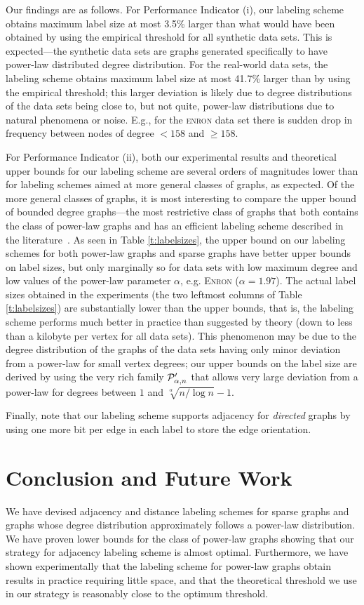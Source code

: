 Our findings are as follows. For Performance Indicator (i), our labeling scheme obtains maximum label size at most 3.5\% larger than what would have been obtained by using the empirical threshold for all synthetic data sets.
This is expected---the synthetic data sets are graphs generated specifically to have power-law distributed degree distribution. For the real-world data sets, the labeling scheme
obtains maximum label size at most 41.7\% larger than by using the empirical threshold; this larger deviation is likely due to degree distributions of the data sets being close to, but not quite,
power-law distributions due to natural phenomena or noise. E.g., for the \textsc{enron} data set there is sudden drop in frequency between nodes of degree $< 158$ and $\geq 158$.

For Performance Indicator (ii), both our experimental results and theoretical upper bounds for our labeling scheme are several orders of magnitudes lower than for labeling schemes aimed at more general classes of graphs, as expected. Of the more general classes of graphs, it is most interesting to compare the upper bound of bounded degree graphs---the most restrictive class of graphs that both contains the class of power-law graphs and has an efficient labeling scheme described in the literature~\cite{adjiashvili2014labeling}. As seen in Table \ref{t:labelsizes}, the upper bound on our labeling schemes for both power-law graphs and sparse graphs have better upper bounds on label sizes, but only marginally so for data sets with low maximum degree and low values of the power-law parameter $\alpha$, e.g. \textsc{Enron} ($\alpha = 1.97$). 
The actual label sizes obtained in the experiments (the two leftmost columns of Table \ref{t:labelsizes}) are substantially lower than the upper bounds, that is,
the labeling scheme performs much better in practice than suggested by theory (down to less than a kilobyte per vertex for all data sets). 
This phenomenon may be due to the degree distribution of the graphs of the data sets having only minor deviation from a power-law for small vertex degrees; our upper bounds on the label size are derived by using the very rich family $ \mathcal{P}'_{\alpha,n}$ that allows very large deviation from a power-law for degrees between $1$ and $\sqrt[\alpha]{n/\log n} - 1$.

Finally, note that our labeling scheme supports adjacency for \emph{directed} graphs by using one more bit per edge in each label to store the edge orientation.
\section{Conclusion and Future Work}
We have devised adjacency and distance labeling schemes for sparse graphs and graphs whose degree distribution approximately follows a power-law distribution.
 We have proven lower bounds for the class of power-law graphs showing that our strategy for adjacency labeling scheme is  almost  optimal. 
 Furthermore, we have shown experimentally that the labeling scheme for power-law graphs obtain
results in practice requiring little  space, and that the theoretical threshold we use in our strategy is reasonably close to the optimum threshold.

